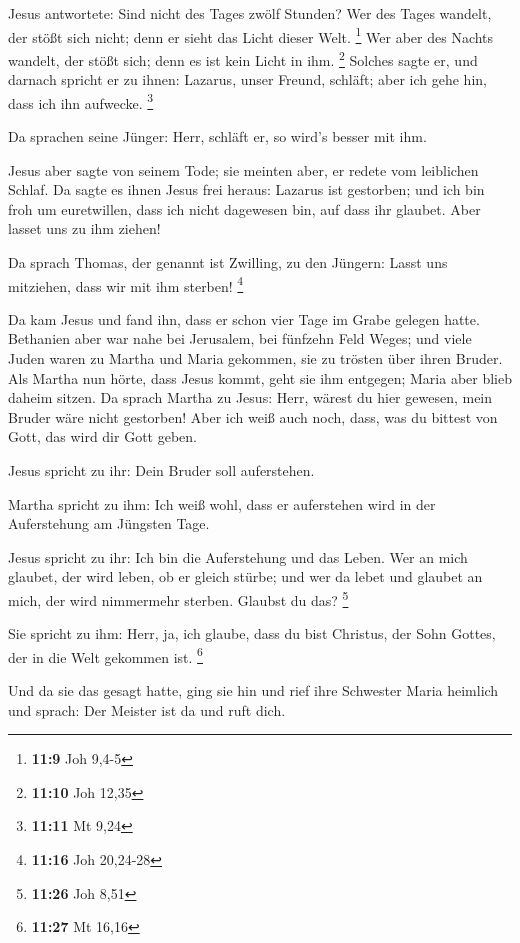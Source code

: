  Jesus antwortete: Sind nicht des Tages zwölf Stunden? Wer
des Tages wandelt, der stößt sich nicht; denn er sieht das Licht dieser
Welt. \footnote{\textbf{11:9} Joh 9,4-5}  Wer aber des
Nachts wandelt, der stößt sich; denn es ist kein Licht in ihm.
\footnote{\textbf{11:10} Joh 12,35}  Solches sagte er, und
darnach spricht er zu ihnen: Lazarus, unser Freund, schläft; aber ich
gehe hin, dass ich ihn aufwecke. \footnote{\textbf{11:11} Mt 9,24}

 Da sprachen seine Jünger: Herr, schläft er, so wird's
besser mit ihm.

 Jesus aber sagte von seinem Tode; sie meinten aber, er
redete vom leiblichen Schlaf.  Da sagte es ihnen Jesus frei
heraus: Lazarus ist gestorben;  und ich bin froh um
euretwillen, dass ich nicht dagewesen bin, auf dass ihr glaubet. Aber
lasset uns zu ihm ziehen!

 Da sprach Thomas, der genannt ist Zwilling, zu den
Jüngern: Lasst uns mitziehen, dass wir mit ihm sterben! \footnote{\textbf{11:16}
  Joh 20,24-28}

 Da kam Jesus und fand ihn, dass er schon vier Tage im
Grabe gelegen hatte.  Bethanien aber war nahe bei
Jerusalem, bei fünfzehn Feld Weges;  und viele Juden waren
zu Martha und Maria gekommen, sie zu trösten über ihren Bruder.
 Als Martha nun hörte, dass Jesus kommt, geht sie ihm
entgegen; Maria aber blieb daheim sitzen.  Da sprach Martha
zu Jesus: Herr, wärest du hier gewesen, mein Bruder wäre nicht
gestorben!  Aber ich weiß auch noch, dass, was du bittest
von Gott, das wird dir Gott geben.

 Jesus spricht zu ihr: Dein Bruder soll auferstehen.

 Martha spricht zu ihm: Ich weiß wohl, dass er auferstehen
wird in der Auferstehung am Jüngsten Tage.

 Jesus spricht zu ihr: Ich bin die Auferstehung und das
Leben. Wer an mich glaubet, der wird leben, ob er gleich stürbe;
 und wer da lebet und glaubet an mich, der wird nimmermehr
sterben. Glaubst du das? \footnote{\textbf{11:26} Joh 8,51}

 Sie spricht zu ihm: Herr, ja, ich glaube, dass du bist
Christus, der Sohn Gottes, der in die Welt gekommen ist. \footnote{\textbf{11:27}
  Mt 16,16}

 Und da sie das gesagt hatte, ging sie hin und rief ihre
Schwester Maria heimlich und sprach: Der Meister ist da und ruft dich.

